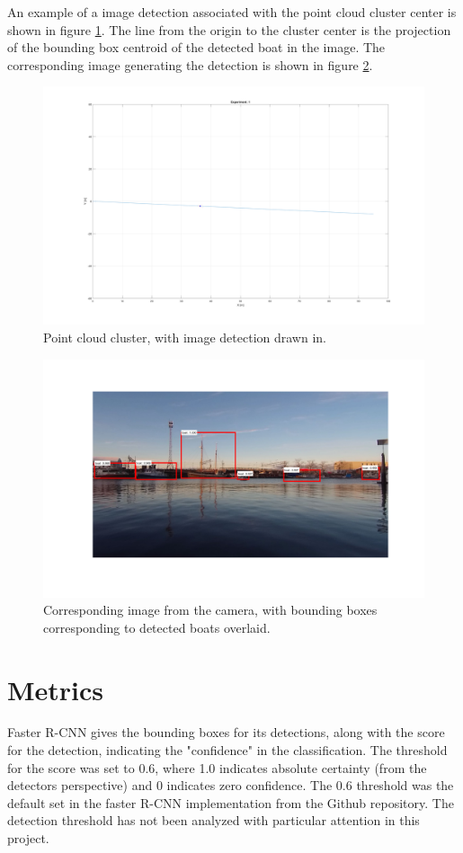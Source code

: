 An example of a image detection associated with the point cloud cluster center is shown in figure \ref{fig:sub_proj_ex1}. The line from the origin to the cluster center is the projection of the bounding box centroid of the detected boat in the image. The corresponding image generating the detection is shown in figure \ref{fig:sub_proj_ex2}.
\begin{figure}[H]
		\centering
		\includegraphics[width=\linewidth]{fig/proj_example.png}
		\caption{Point cloud cluster, with image detection drawn in.}
		\label{fig:sub_proj_ex1}
\end{figure}%
\begin{figure}[H]
		\centering
		\includegraphics[width=\linewidth]{fig/proj_example_im.png}
		\caption{Corresponding image from the camera, with bounding boxes corresponding to detected boats overlaid.}
		\label{fig:sub_proj_ex2}
\end{figure}

\section{Metrics}
Faster R-CNN gives the bounding boxes for its detections, along with the score for the detection, indicating the "confidence" in the classification. The threshold for the score was set to 0.6, where 1.0 indicates absolute certainty (from the detectors perspective) and 0 indicates zero confidence. The 0.6 threshold was the default set in the faster R-CNN implementation from the Github repository. The detection threshold has not been analyzed with particular attention in this project.

